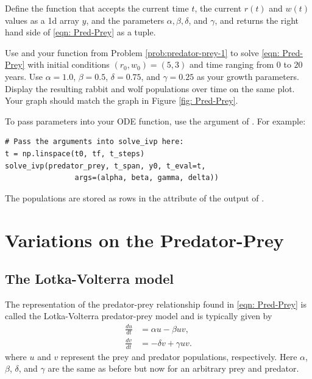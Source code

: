 \begin{problem}\label{prob:predator-prey-1}
Define the function  that accepts the current time $t$, the current $r(t)$ and $w(t)$ values as a 1d array $y$, and the parameters $\alpha, \beta, \delta$, and $\gamma$,
and returns the right hand side of \eqref{eqn: Pred-Prey} as a tuple. 
\end{problem}

\begin{problem}\label{prob:predator-prey-2}
Use  and your function from Problem \ref{prob:predator-prey-1} to solve \eqref{eqn: Pred-Prey} with initial conditions $(r_0, w_0) = (5, 3)$ and time ranging from $0$ to $20$ years.
Use $\alpha=1.0$, $\beta=0.5$, $\delta=0.75$, and $\gamma=0.25$ as your growth parameters.
Display the resulting rabbit and wolf populations over time on the same plot. Your graph should match the graph in Figure \ref{fig: Pred-Prey}.

To pass parameters into your ODE function, use the  argument of . For example:
\begin{lstlisting}
# Pass the arguments into solve_ivp here:
t = np.linspace(t0, tf, t_steps)
solve_ivp(predator_prey, t_span, y0, t_eval=t,
				args=(alpha, beta, gamma, delta))
\end{lstlisting}
The populations are stored as rows in the attribute  of the output of .
\end{problem}

\section*{Variations on the Predator-Prey}
\subsection*{The Lotka-Volterra model}
The representation of the predator-prey relationship found in \eqref{eqn: Pred-Prey} is called the Lotka-Volterra predator-prey model and is typically given by %
\begin{align*}
	\frac{du}{dt} &= \alpha u - \beta uv,\\
	\frac{dv}{dt} &= -\delta v + \gamma uv.
\end{align*}
where $u$ and $v$ represent the prey and predator populations, respectively. Here $\alpha$, $\beta$, $\delta$, and $\gamma$ are the same as before but now for an arbitrary prey and predator.%

